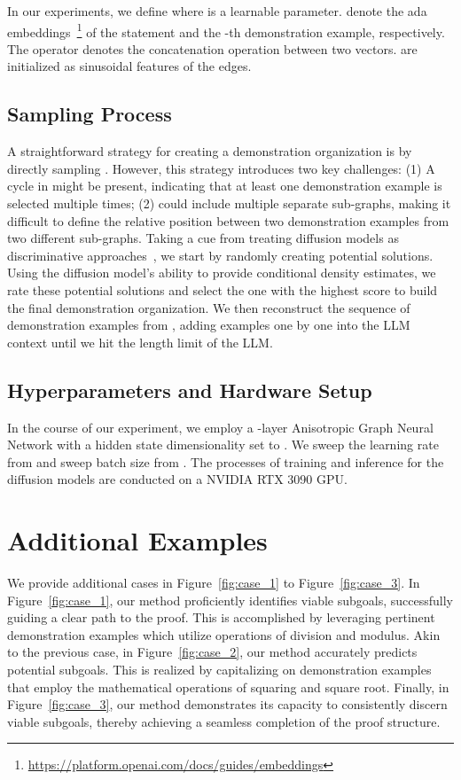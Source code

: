 \documentclass{article}
\begin{document}
In our experiments, we define  where  is a learnable parameter.   denote the ada embeddings~\footnote{\url{https://platform.openai.com/docs/guides/embeddings}} of the statement  and the -th demonstration example, respectively. The operator  denotes the concatenation operation between two vectors.  are initialized as sinusoidal features of the edges.



\subsection{Sampling Process}
A straightforward strategy for creating a demonstration organization is by directly sampling . However, this strategy introduces two key challenges: (1) A cycle in  might be present, indicating that at least one demonstration example is selected multiple times; (2)  could include multiple separate sub-graphs, making it difficult to define the relative position between two demonstration examples from two different sub-graphs. Taking a cue from treating diffusion models as discriminative approaches~\cite{li2023your}, we start by randomly creating  potential solutions. Using the diffusion model's ability to provide conditional density estimates, we rate these  potential solutions and select the one with the highest score to build the final demonstration organization. We then reconstruct the sequence of demonstration examples from , adding examples one by one into the LLM context until we hit the length limit of the LLM.

\subsection{Hyperparameters and Hardware Setup}

In the course of our experiment, we employ a -layer Anisotropic Graph Neural Network with a hidden state dimensionality set to .  We sweep the learning rate from  and sweep batch size from . The processes of training and inference for the diffusion models are conducted on a NVIDIA RTX 3090 GPU.





\section{Additional Examples}
\label{sec:appendix_case}
We provide additional cases in Figure~\ref{fig:case_1} to Figure~\ref{fig:case_3}. 
In Figure~\ref{fig:case_1}, our method proficiently identifies viable subgoals, successfully guiding a clear path to the proof. This is accomplished by leveraging pertinent demonstration examples which utilize operations of division and modulus. Akin to the previous case, in Figure~\ref{fig:case_2}, our method accurately predicts potential subgoals. This is realized by capitalizing on demonstration examples that employ the mathematical operations of squaring and square root. Finally, in Figure~\ref{fig:case_3}, our method demonstrates its capacity to consistently discern viable subgoals, thereby achieving a seamless completion of the proof structure. 
\end{document}
